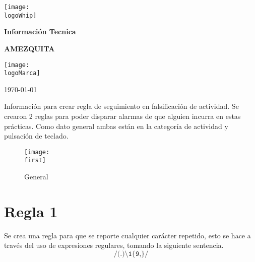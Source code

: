 \documentclass[a4paper]{article}
\newcommand{\canal}{AMEZQUITA}
\newcommand{\startDate}{\today}
\newcommand{\logoMarca}{img/teramindComplete.png}
\newcommand{\logoWhip}{img/largeW.png}
\newcommand{\first}{img/captura1.png}
\begin{document}
    \begin{titlepage}
        \centering
        \texttt{[image: \\logoWhip]}
        \par\vspace{1cm}
        {\LARGE\textbf{Información Tecnica}}
        \par\vspace{0.9cm}
        {\Huge\bfseries\textcolor{greenPortada}{\canal}}
        \vfill

        \par\vspace{0.4cm}
        \texttt{[image: \\logoMarca]}
        \vfill

        \par\vspace{1cm}

        {\large\startDate\par}

    \end{titlepage}
    \clearpage

    Información para crear regla de seguimiento en falsificación de actividad.
    Se crearon 2 reglas para poder disparar alarmas de que alguien incurra en estas prácticas.
    Como dato general ambas están en la categoría de actividad y pulsación de teclado.

    \begin{figure}[H] 
        \centering 
        \texttt{[image: \\first]} 
        \caption{General} 
    \end{figure} 
    
    \section{Regla 1}
    Se crea una regla para que se reporte cualquier carácter repetido, esto se hace a través del uso de expresiones regulares, tomando la siguiente sentencia.
    \begin{displaymath}
        \texttt{/(.)\textbackslash1\{9,\}/}
    \end{displaymath}
    
\end{document}
